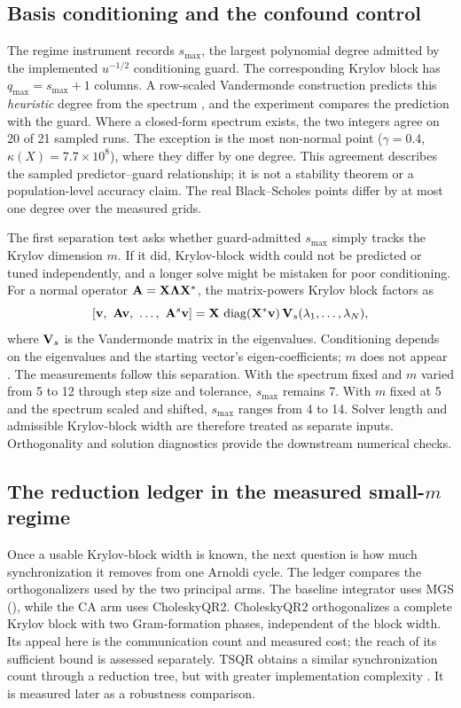 \subsection{Basis conditioning and the confound control}\label{sec:conditioning}

The regime instrument records $s_{\max}$, the largest polynomial degree admitted by the implemented $u^{-1/2}$ conditioning guard. The corresponding Krylov block has $q_{\max}=s_{\max}+1$ columns. A row-scaled Vandermonde construction predicts this \emph{heuristic} degree from the spectrum \cite{trefethen-1997}, and the experiment compares the prediction with the guard. Where a closed-form spectrum exists, the two integers agree on 20 of 21 sampled runs. The exception is the most non-normal point ($\gamma=0.4$, $\kappa(X)=7.7\times10^8$), where they differ by one degree. This agreement describes the sampled predictor--guard relationship; it is not a stability theorem or a population-level accuracy claim. The real Black--Scholes points differ by at most one degree over the measured grids.

The first separation test asks whether guard-admitted $s_{\max}$ simply tracks the Krylov dimension $m$. If it did, Krylov-block width could not be predicted or tuned independently, and a longer solve might be mistaken for poor conditioning. For a normal operator $\mathbf{A}=\mathbf{X}\bm{\Lambda}\mathbf{X}^*$, the matrix-powers Krylov block factors as
\[
[\vect{v},\ \mat{A}\vect{v},\ \ldots,\ \mat{A}^s\vect{v}]
= \mat{X}\, \operatorname{diag}(\mat{X}^*\vect{v})\,
  \mat{V}_s(\lambda_1, \ldots, \lambda_N),
\]
where $\mathbf{V}_s$ is the Vandermonde matrix in the eigenvalues. Conditioning depends on the eigenvalues and the starting vector's eigen-coefficients; $m$ does not appear \cite{trefethen-1997,carson-2015}. The measurements follow this separation. With the spectrum fixed and $m$ varied from 5 to 12 through step size and tolerance, $s_{\max}$ remains 7. With $m$ fixed at 5 and the spectrum scaled and shifted, $s_{\max}$ ranges from 4 to 14. Solver length and admissible Krylov-block width are therefore treated as separate inputs. Orthogonality and solution diagnostics provide the downstream numerical checks.

\subsection{The reduction ledger in the measured small-$m$ regime}\label{sec:ledger}

Once a usable Krylov-block width is known, the next question is how much synchronization it removes from one Arnoldi cycle. The ledger compares the orthogonalizers used by the two principal arms. The baseline integrator uses MGS (), while the CA arm uses CholeskyQR2. CholeskyQR2 orthogonalizes a complete Krylov block with two Gram-formation phases, independent of the block width. Its appeal here is the communication count and measured cost; the reach of its sufficient bound is assessed separately. TSQR obtains a similar synchronization count through a reduction tree, but with greater implementation complexity \cite{demmel-2008,hoemmen-2010}. It is measured later as a robustness comparison.

